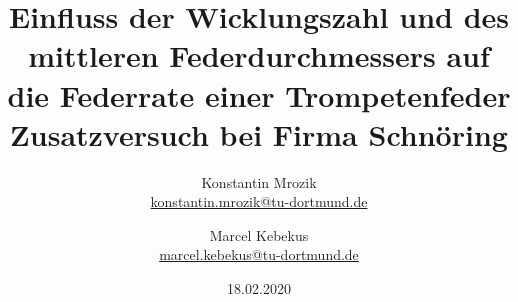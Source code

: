 

\title{Einfluss der Wicklungszahl und des mittleren Federdurchmessers auf die 
Federrate einer Trompetenfeder\\\small{Zusatzversuch bei Firma Schnöring}}
\author{%
  Konstantin Mrozik\\%
  \href{mailto:konstantin.mrozik@tu-dortmund.de}{konstantin.mrozik@tu-dortmund.de}%
  \and%
  Marcel Kebekus\\%
  \href{mailto:marcel.kebekus@tu-dortmund.de}{marcel.kebekus@tu-dortmund.de}%
}
\date{%
  18.02.2020 
}
\publishers{TU Dortmund – Fakultät Physik}
\makeatletter         
\def\@maketitle{
\raggedright
\texttt{[image: bilder/tud\_logo\_rgb.jpg]}\\[8ex]
\begin{center}
{\Huge \bfseries \sffamily \@title }\\[4ex] 
{\Large  \@author}\\[4ex] 
\@date\\[8ex]
\publishers\\
\end{center}}
\makeatother





\maketitle
\thispagestyle{empty}
\tableofcontents
\newpage





\nocite{}
\printbibliography



